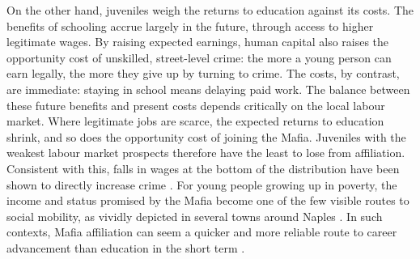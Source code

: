 \documentclass[12pt]{article}
\theoremstyle{plain}
\theoremstyle{plain}
\theoremstyle{plain}
\theoremstyle{definition}
\theoremstyle{plain}
\theoremstyle{definition}
\theoremstyle{plain}
\theoremstyle{remark}
\theoremstyle{definition}
\theoremstyle{definition}
\theoremstyle{plain}
\begin{document}
On the other hand, juveniles weigh the returns to education against its costs. The benefits of schooling accrue largely in the future, through access to higher legitimate wages. By raising expected earnings, human capital also raises the opportunity cost of unskilled, street-level crime\citep{lochner_education_2004}: the more a young person can earn legally, the more they give up by turning to crime. The costs, by contrast, are immediate: staying in school means delaying paid work. The balance between these future benefits and present costs depends critically on the local labour market. Where legitimate jobs are scarce, the expected returns to education shrink, and so does the opportunity cost of joining the Mafia. Juveniles with the weakest labour market prospects therefore have the least to lose from affiliation. Consistent with this, falls in wages at the bottom of the distribution have been shown to directly increase crime \citep{machin_crime_2004}. For young people growing up in poverty, the income and status promised by the Mafia become one of the few visible routes to social mobility, as vividly depicted in several towns around Naples \citep{balestrini_sandokan_2004}. In such contexts, Mafia affiliation can seem a quicker and more reliable route to career advancement than education in the short term \citep{catozzella_alveare_2011}. \par
\end{document}
